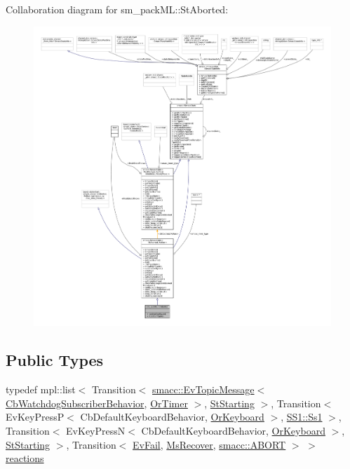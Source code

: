 Collaboration diagram for sm\+\_\+pack\+ML\+:\+:St\+Aborted\+:
\nopagebreak
\begin{figure}[H]
\begin{center}
\leavevmode
\includegraphics[width=350pt]{structsm__packML_1_1StAborted__coll__graph}
\end{center}
\end{figure}
\subsection*{Public Types}
\begin{DoxyCompactItemize}
\item 
typedef mpl\+::list$<$ Transition$<$ \hyperlink{structsmacc_1_1default__events_1_1EvTopicMessage}{smacc\+::\+Ev\+Topic\+Message}$<$ \hyperlink{classsm__packML_1_1cl__subscriber_1_1CbWatchdogSubscriberBehavior}{Cb\+Watchdog\+Subscriber\+Behavior}, \hyperlink{classsm__packML_1_1OrTimer}{Or\+Timer} $>$, \hyperlink{structsm__packML_1_1StStarting}{St\+Starting} $>$, Transition$<$ Ev\+Key\+PressP$<$ Cb\+Default\+Keyboard\+Behavior, \hyperlink{classsm__packML_1_1OrKeyboard}{Or\+Keyboard} $>$, \hyperlink{structsm__packML_1_1SS1_1_1Ss1}{S\+S1\+::\+Ss1} $>$, Transition$<$ Ev\+Key\+PressN$<$ Cb\+Default\+Keyboard\+Behavior, \hyperlink{classsm__packML_1_1OrKeyboard}{Or\+Keyboard} $>$, \hyperlink{structsm__packML_1_1StStarting}{St\+Starting} $>$, Transition$<$ \hyperlink{structsm__packML_1_1EvFail}{Ev\+Fail}, \hyperlink{classsm__packML_1_1MsRecover}{Ms\+Recover}, \hyperlink{structsmacc_1_1default__transition__tags_1_1ABORT}{smacc\+::\+A\+B\+O\+RT} $>$ $>$ \hyperlink{structsm__packML_1_1StAborted_a83e918849f9b2c3807d23f9677f8caba}{reactions}
\end{DoxyCompactItemize}
